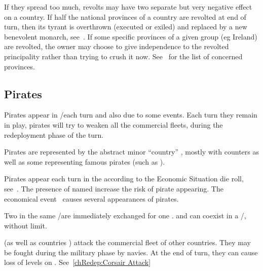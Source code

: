  If they spread too much, revolts may have two
separate but very negative effect on a country.
\bparag If half the national provinces of a country are revolted at end of
turn, then its tyrant is overthrown (executed or exiled) and replaced by a new
benevolent monarch, see~.
\bparag If some specific provinces of a given group (eg Ireland) are revolted,
the owner may choose to give independence to the revolted principality rather
than trying to crush it now. See~ for the list of concerned provinces.



\subsection{Pirates}

Pirates appear in \STZ/\CTZ each turn and also due to some events. Each turn
they remain in play, pirates will try to weaken all the commercial fleets,
during the redeployment phase of the turn.

Pirates are represented by the abstract minor ``country'' ,
mostly with \corsaire counters as well as some \LeaderA representing famous
pirates (such as \leaderBlackbeard).

 Pirates appear each turn in the \ROTW \STZ
according to the Economic Situation die roll, see~.
\bparag The presence of named  \LeaderA increase the risk of
pirate appearing.
\bparag The economical event~ causes several appearances
of pirates.

 Two  \corsaire\facemoins in the
same \STZ/\CTZ are immediately exchanged for one 
\corsaire\faceplus.  \corsaire\faceplus and \Facemoins can
coexist in a \STZ/\CTZ, without limit.


  \corsaire (as well as countries
\corsaire) attack the commercial fleet of other countries.
\bparag They may be fought during the military phase by navies.
\bparag At the end of turn, they can cause loss of levels on \TradeFLEET.
\bparag See~\ref{chRedep:Corsair Attack}




